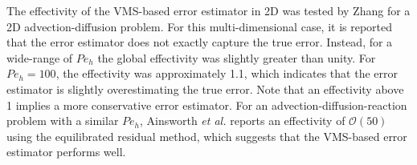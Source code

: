 The effectivity of the VMS-based error estimator in 2D was tested by Zhang \cite{zhang19} for a 2D advection-diffusion problem. For this multi-dimensional case, it is reported that the error estimator does not exactly capture the true error. Instead, for a wide-range of $Pe_h$ the global effectivity was slightly greater than unity.   
For $Pe_h=100$, the effectivity was approximately 1.1, which indicates that the error estimator is slightly overestimating the true error.
Note that an effectivity above 1 implies a more conservative error estimator. 
For an advection-diffusion-reaction problem with a similar $Pe_h$, Ainsworth \textit{et al.} \cite{ainsworth2013fully} reports an effectivity of $\mathcal{O}(50)$ using the equilibrated residual method, which suggests that the VMS-based error estimator performs well.

 


